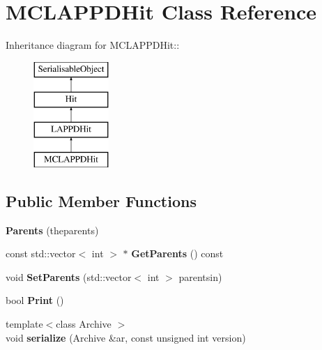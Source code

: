 \hypertarget{classMCLAPPDHit}{
\section{MCLAPPDHit Class Reference}
\label{classMCLAPPDHit}
}
Inheritance diagram for MCLAPPDHit::\begin{figure}[H]
\begin{center}
\leavevmode
\includegraphics[height=4cm]{classMCLAPPDHit}
\end{center}
\end{figure}
\subsection*{Public Member Functions}
\begin{DoxyCompactItemize}
\item 
\hypertarget{classMCLAPPDHit_a376553aaa3ca2a5920e04fbb116a0b55}{
{\bfseries Parents} (theparents)}
\label{classMCLAPPDHit_a376553aaa3ca2a5920e04fbb116a0b55}

\item 
\hypertarget{classMCLAPPDHit_a2cd53e715b43962eece869e296f0efdb}{
const std::vector$<$ int $>$ $\ast$ {\bfseries GetParents} () const }
\label{classMCLAPPDHit_a2cd53e715b43962eece869e296f0efdb}

\item 
\hypertarget{classMCLAPPDHit_a1edf49747c6858e203a3185ec0f656a4}{
void {\bfseries SetParents} (std::vector$<$ int $>$ parentsin)}
\label{classMCLAPPDHit_a1edf49747c6858e203a3185ec0f656a4}

\item 
\hypertarget{classMCLAPPDHit_a90639fe126043eeb4222860265d0e3c5}{
bool {\bfseries Print} ()}
\label{classMCLAPPDHit_a90639fe126043eeb4222860265d0e3c5}

\item 
\hypertarget{classMCLAPPDHit_ad04838bfc8db66fff91d0bd8f5ff48b5}{
{\footnotesize template$<$class Archive $>$ }\\void {\bfseries serialize} (Archive \&ar, const unsigned int version)}
\label{classMCLAPPDHit_ad04838bfc8db66fff91d0bd8f5ff48b5}

\end{DoxyCompactItemize}
